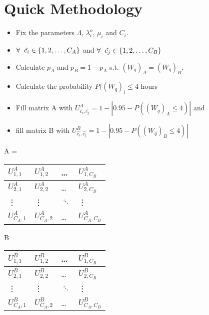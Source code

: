 \documentclass{article}
\begin{document}
\newpage
\section{Quick Methodology}

\begin{itemize}
    \item Fix the parameters $\Lambda$, $\lambda_i^o$, $\mu_i$ and $C_i$. 
    \item $\forall \hspace{0.2cm} \hat{c_i} \in \{1,2, \dots, C_A\}$ and $\forall \hspace{0.2cm} \hat{c_j} \in \{1,2, \dots, C_B\}$ 
    \item Calculate $p_A$ and $p_B = 1-p_A$ s.t. $(W_q)_A = (W_q)_B$. 
    \item Calculate the probability $P((W_q)_i \leq 4$ hours
    \item Fill matrix A with $ U_{\hat{c_i}, \hat{c_j}}^A = 1 - |0.95 - P((W_q)_A \leq 4)|$ and
    \item fill matrix B with $ U_{\hat{c_i}, \hat{c_j}}^B = 1 - |0.95 - P((W_q)_B \leq 4)| $
\end{itemize}



\begin{table}[h]
    \centering
    A = 
    \begin{tabular}{|l|l|l|l|}
    \hline
    $U_{1,1}^A$ & $U_{1,2}^A$ & \dots & $U_{1,C_B}^A$ \\ \hline
    $U_{2,1}^A$ & $U_{2,2}^A$ & \dots & $U_{2,C_B}^A$ \\ \hline
    \vdots & \vdots & $\ddots$ & \vdots \\ \hline
    $U_{C_A,1}^A$ & $U_{C_A,2}^A$ & \dots & $U_{C_A,C_B}^A$ \\ \hline
    \end{tabular}
\end{table}  

\begin{table}[h]
    \centering
    B = 
    \begin{tabular}{|l|l|l|l|}
    \hline
    $U_{1,1}^B$ & $U_{1,2}^B$ & \dots & $U_{1,C_B}^B$ \\ \hline
    $U_{2,1}^B$ & $U_{2,2}^B$ & \dots & $U_{2,C_B}^B$ \\ \hline
    \vdots & \vdots & $\ddots$ & \vdots \\ \hline
    $U_{C_A,1}^B$ & $U_{C_A,2}^B$ & \dots & $U_{C_A,C_B}^B$ \\ \hline
    \end{tabular}
\end{table}  
\end{document}

